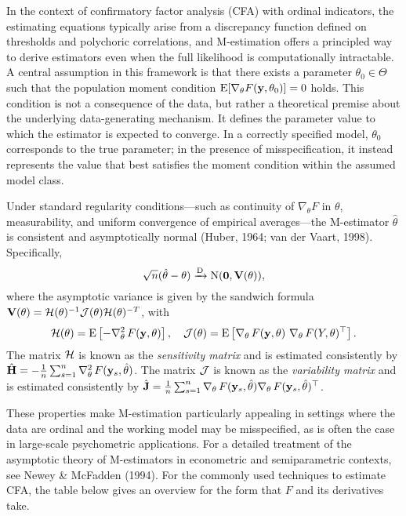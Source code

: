 \documentclass[
  letterpaper,
  DIV=11,
  numbers=noendperiod]{scrartcl}
\begin{document}
In the context of confirmatory factor analysis (CFA) with ordinal
indicators, the estimating equations typically arise from a discrepancy
function defined on thresholds and polychoric correlations, and
M-estimation offers a principled way to derive estimators even when the
full likelihood is computationally intractable. A central assumption in
this framework is that there exists a parameter \(\theta_0 \in \Theta\)
such that the population moment condition
\(\operatorname{E}[\nabla_\theta F({\mathbf y}, \theta_0)] = 0\) holds. This condition is not
a consequence of the data, but rather a theoretical premise about the
underlying data-generating mechanism. It defines the parameter value to
which the estimator is expected to converge. In a correctly specified
model, \(\theta_0\) corresponds to the true parameter; in the presence
of misspecification, it instead represents the value that best satisfies
the moment condition within the assumed model class.

Under standard regularity conditions---such as continuity of
\(\nabla_\theta F\) in \(\theta\), measurability, and uniform
convergence of empirical averages---the M-estimator \(\hat\theta\) is
consistent and asymptotically normal (Huber, 1964; van der Vaart, 1998).
Specifically, \[
\sqrt{n}(\hat\theta - \theta) \xrightarrow{\text D} \operatorname{N}({\mathbf 0}, {\mathbf V}(\theta)),
\] where the asymptotic variance is given by the sandwich formula
\({\mathbf V}(\theta) = {\mathcal H}(\theta)^{-1} {\mathcal J}(\theta) {\mathcal H}(\theta)^{-T}\), with \[
{\mathcal H}(\theta) = \operatorname{E} \left[ - \nabla_\theta^2 \, F({\mathbf y},\theta) \right], \quad
{\mathcal J}(\theta) = \operatorname{E} \left[ \nabla_\theta \,F({\mathbf y},\theta) \ \nabla_\theta \, F(Y,\theta) ^\top \right].
\] The matrix \({\mathcal H}\) is known as the \emph{sensitivity matrix} and is
estimated consistently by
\(\hat{{\mathbf H}} = -\frac{1}{n} \sum_{s=1}^n \nabla_\theta^2 \, F({\mathbf y}_s, \hat\theta)\).
The matrix \({\mathcal J}\) is known as the \emph{variability matrix} and is
estimated consistently by
\(\hat{{\mathbf J}} = \frac{1}{n} \sum_{s=1}^n \nabla_\theta \, F({\mathbf y}_s, \hat\theta) \nabla_\theta \, F({\mathbf y}_s, \hat\theta)^\top\).

These properties make M-estimation particularly appealing in settings
where the data are ordinal and the working model may be misspecified, as
is often the case in large-scale psychometric applications. For a
detailed treatment of the asymptotic theory of M-estimators in
econometric and semiparametric contexts, see Newey \& McFadden (1994).
For the commonly used techniques to estimate CFA, the table below gives
an overview for the form that \(F\) and its derivatives take.
\end{document}
